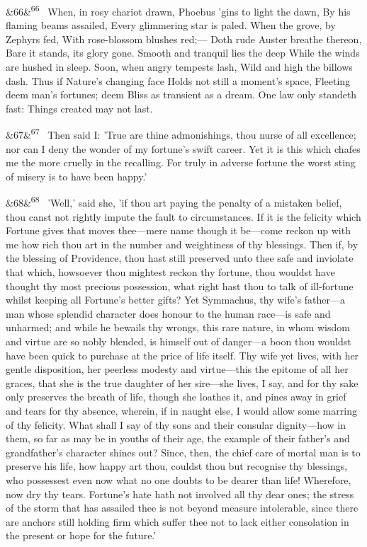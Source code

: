 \documentclass[12pt]{article}
\newcommand{\para}[1][]{\par\noindent\ifx&#1&\else\textsuperscript{\footnotesize #1}~\fi}
\begin{document}
\para[66] When, in rosy chariot drawn, Phoebus 'gins to light the dawn, By his flaming beams assailed, Every glimmering star is paled. When the grove, by Zephyrs fed, With rose-blossom blushes red;--- Doth rude Auster breathe thereon, Bare it stands, its glory gone. Smooth and tranquil lies the deep While the winds are hushed in sleep. Soon, when angry tempests lash, Wild and high the billows dash. Thus if Nature's changing face Holds not still a moment's space, Fleeting deem man's fortunes; deem Bliss as transient as a dream. One law only standeth fast: Things created may not last.

\para[67] Then said I: 'True are thine admonishings, thou nurse of all excellence; nor can I deny the wonder of my fortune's swift career. Yet it is this which chafes me the more cruelly in the recalling. For truly in adverse fortune the worst sting of misery is to have been happy.'

\para[68] 'Well,' said she, 'if thou art paying the penalty of a mistaken belief, thou canst not rightly impute the fault to circumstances. If it is the felicity which Fortune gives that moves thee---mere name though it be---come reckon up with me how rich thou art in the number and weightiness of thy blessings. Then if, by the blessing of Providence, thou hast still preserved unto thee safe and inviolate that which, howsoever thou mightest reckon thy fortune, thou wouldst have thought thy most precious possession, what right hast thou to talk of ill-fortune whilst keeping all Fortune's better gifts? Yet Symmachus, thy wife's father---a man whose splendid character does honour to the human race---is safe and unharmed; and while he bewails thy wrongs, this rare nature, in whom wisdom and virtue are so nobly blended, is himself out of danger---a boon thou wouldst have been quick to purchase at the price of life itself. Thy wife yet lives, with her gentle disposition, her peerless modesty and virtue---this the epitome of all her graces, that she is the true daughter of her sire---she lives, I say, and for thy sake only preserves the breath of life, though she loathes it, and pines away in grief and tears for thy absence, wherein, if in naught else, I would allow some marring of thy felicity. What shall I say of thy sons and their consular dignity---how in them, so far as may be in youths of their age, the example of their father's and grandfather's character shines out? Since, then, the chief care of mortal man is to preserve his life, how happy art thou, couldst thou but recognise thy blessings, who possessest even now what no one doubts to be dearer than life! Wherefore, now dry thy tears. Fortune's hate hath not involved all thy dear ones; the stress of the storm that has assailed thee is not beyond measure intolerable, since there are anchors still holding firm which suffer thee not to lack either consolation in the present or hope for the future.'
\end{document}
